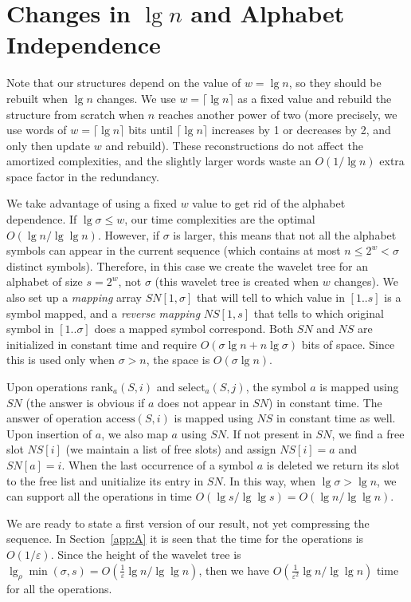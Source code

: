 \documentclass[11pt]{article}
\def\idrm#1{\ensuremath{\mathrm{#1}}}
\newcommand{\ra}{\idrm{rank}}
\newcommand{\sel}{\idrm{select}}
\newcommand{\acc}{\idrm{access}}
\newcommand{\eps}{\varepsilon}
\begin{document}
\section{Changes in $\lg n$ and Alphabet Independence}  \label{sec:space}

Note that our structures depend on the value of $w=\lg n$, so they
should be rebuilt when $\lg n$ changes. We use $w=\lceil \lg n\rceil$ as a
fixed value and rebuild the structure from scratch when $n$ reaches another 
power of two (more precisely, we use words of $w=\lceil \lg n\rceil$ bits
until $\lceil \lg n\rceil$ increases by 1 or decreases by 2, and only then
update $w$ and rebuild). These reconstructions do not affect the amortized 
complexities, and the slightly larger words waste an $O(1/\lg n)$ extra space 
factor in the redundancy.

We take advantage of using a fixed $w$ value 
to get rid of the alphabet dependence. If
$\lg\sigma \le w$, our time complexities are the optimal 
$O(\lg n /\lg\lg n)$. However, if $\sigma$ is larger, this means that not all
the alphabet symbols can appear in the current sequence (which contains at most
$n \le 2^w < \sigma$ distinct symbols). Therefore, in this case we create
the wavelet tree for an alphabet of size $s=2^w$, not $\sigma$
(this wavelet tree is created when $w$ changes).
We also set up a {\em mapping}
array $SN[1,\sigma]$ that will tell to which value in $[1..s]$ is a symbol 
mapped, and
a {\em reverse mapping} $NS[1,s]$ that tells to which original symbol in
$[1..\sigma]$ does a mapped symbol correspond. Both $SN$ and $NS$ are initialized
in constant time \cite[Section III.8.1]{Meh84} and require $O(\sigma\lg n +
n\lg\sigma)$ bits of space. Since this is used only when $\sigma > n$, the
space is $O(\sigma\lg n)$.

Upon operations $\ra_a(S,i)$ and $\sel_a(S,j)$, the symbol $a$ is mapped using
$SN$ (the answer is obvious if $a$ does not appear in $SN$) in constant time.
The answer of operation $\acc(S,i)$ is mapped using $NS$ in constant time as 
well. Upon insertion of $a$, we also map $a$ using $SN$. If not present in $SN$,
we find a free slot $NS[i]$ (we maintain a list of free slots) and assign 
$NS[i] = a$ and $SN[a]=i$.
When the last occurrence of a symbol $a$ is deleted we return its slot to
the free list and unitialize its entry in $SN$. In this way, when $\lg\sigma
> \lg n$, we can support all the operations in time $O(\lg s / \lg\lg s) =
O(\lg n / \lg\lg n)$.

We are ready to state a first version of our result, not yet compressing
the sequence. In Section~\ref{app:A} it is seen
that the time for the operations is $O(1/\eps)$. Since the
height of the wavelet tree is $\lg_\rho \min(\sigma,s) = O(\frac{1}{\eps}\lg n /
\lg\lg n)$, then we have $O(\frac{1}{\eps^2}\lg n/\lg\lg n)$ time 
for all the operations.
\end{document}
